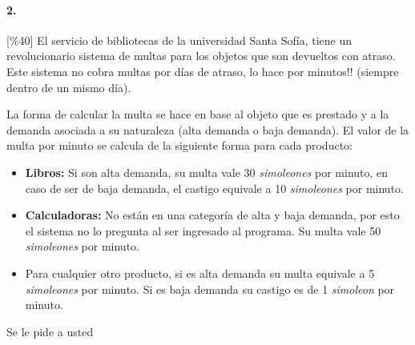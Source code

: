 \paragraph{2.}

[\%40] El servicio de bibliotecas de la universidad Santa Sofía, tiene un revolucionario sistema de multas para los objetos que son devueltos con atraso. Este sistema no cobra multas por días de atraso, lo hace por minutos!! (siempre dentro de un mismo día). 

La forma de calcular la multa se hace en base al objeto que es prestado y a la demanda asociada a su naturaleza (alta demanda o baja demanda). El valor de la multa por minuto se calcula de la siguiente forma para cada producto:
\begin{itemize}
    \item \textbf{Libros:} Si son alta demanda, su multa vale 30 \textit{simoleones} por minuto, en caso de ser de baja demanda, el castigo equivale a 10 \textit{simoleones} por minuto.
    \item \textbf{Calculadoras:} No están en una categoría de alta y baja demanda, por esto el sistema no lo pregunta al ser ingresado al programa. Su multa vale 50 \textit{simoleones} por minuto.
    \item Para cualquier otro producto, si es alta demanda su multa equivale a 5 \textit{simoleones} por minuto. Si es baja demanda su castigo es de 1 \textit{simoleon} por minuto.
\end{itemize}
Se le pide a usted 
